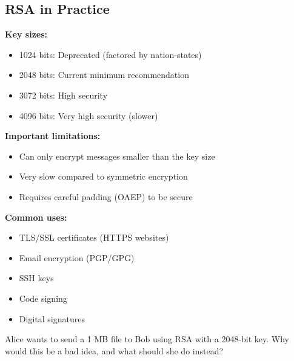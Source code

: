 \documentclass[11pt,a4paper]{report}
\begin{document}
\subsection{RSA in Practice}

\textbf{Key sizes:}
\begin{itemize}
\item 1024 bits: Deprecated (factored by nation-states)
\item 2048 bits: Current minimum recommendation
\item 3072 bits: High security
\item 4096 bits: Very high security (slower)
\end{itemize}

\textbf{Important limitations:}
\begin{itemize}
\item Can only encrypt messages smaller than the key size
\item Very slow compared to symmetric encryption
\item Requires careful padding (OAEP) to be secure
\end{itemize}

\textbf{Common uses:}
\begin{itemize}
\item TLS/SSL certificates (HTTPS websites)
\item Email encryption (PGP/GPG)
\item SSH keys
\item Code signing
\item Digital signatures
\end{itemize}

\begin{ex}
Alice wants to send a 1 MB file to Bob using RSA with a 2048-bit key. Why would this be a bad idea, and what should she do instead?
\end{ex}
\end{document}
